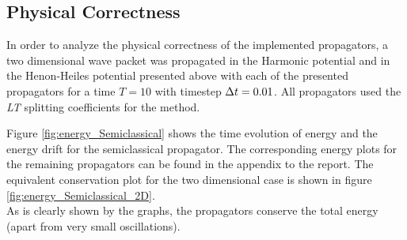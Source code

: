 \subsection{Physical Correctness}
\label{subsec:physical}
%
In order to analyze the physical correctness of the implemented propagators, a two dimensional wave packet was propagated in the Harmonic potential and in the Henon-Heiles potential presented above with each of the presented propagators for a time $T = 10$ with timestep $\Delta t = 0.01$.
All propagators used the \emph{LT} splitting coefficients for the  method.
\par\medskip
%
Figure \ref{fig:energy_Semiclassical} shows the time evolution of energy and the energy drift for the semiclassical propagator. The corresponding energy plots for the remaining propagators can be found in the appendix to the report.
The equivalent conservation plot for the two dimensional case is shown in figure \ref{fig:energy_Semiclassical_2D}. \\
As is clearly shown by the graphs, the propagators conserve the total energy (apart from very small oscillations).
%
